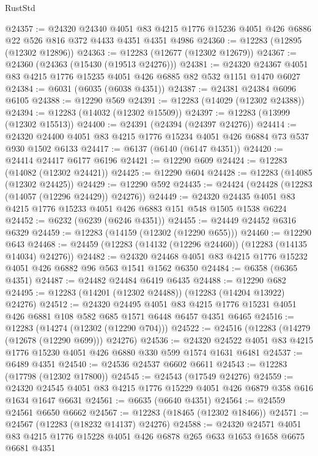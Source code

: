 \begin{lexlean}{RustStd}
\begin{coremodule}
@24357 := @24320
    @24340
    @4051
    @83
    @4215
    @1776
    @15236
    @4051
    @426
    @6886
    @22
    @526
    @816
    @372
    @4433
    @4351
    @4351
    @4986
@24360 := @12283 (@12895 (@12302 @12896))
@24363 := @12283 (@12677 (@12302 @12679))
@24367 := @24360 (@24363 (@15430 (@19513 @24276)))
@24381 := @24320 @24367 @4051 @83 @4215 @1776 @15235 @4051 @426 @6885 @82 @532 @1151 @1470 @6027
@24384 := @6031 (@6035 (@6038 @4351))
@24387 := @24381 @24384 @6096 @6105
@24388 := @12290 @569
@24391 := @12283 (@14029 (@12302 @24388))
@24394 := @12283 (@14032 (@12302 @15509))
@24397 := @12283 (@13999 (@12302 @15513))
@24400 := @24391 (@24394 (@24397 @24276))
@24414 := @24320 @24400 @4051 @83 @4215 @1776 @15234 @4051 @426 @6884 @73 @537 @930 @1502 @6133
@24417 := @6137 (@6140 (@6147 @4351))
@24420 := @24414 @24417 @6177 @6196
@24421 := @12290 @609
@24424 := @12283 (@14082 (@12302 @24421))
@24425 := @12290 @604
@24428 := @12283 (@14085 (@12302 @24425))
@24429 := @12290 @592
@24435 := @24424 (@24428 (@12283 (@14057 (@12296 @24429)) @24276))
@24449 := @24320 @24435 @4051 @83 @4215 @1776 @15233 @4051 @426 @6883 @151 @548 @1505 @1538 @6224
@24452 := @6232 (@6239 (@6246 @4351))
@24455 := @24449 @24452 @6316 @6329
@24459 := @12283 (@14159 (@12302 (@12290 @655)))
@24460 := @12290 @643
@24468 := @24459 (@12283 (@14132 (@12296 @24460)) (@12283 (@14135 @14034) @24276))
@24482 := @24320 @24468 @4051 @83 @4215 @1776 @15232 @4051 @426 @6882 @96 @563 @1541 @1562 @6350
@24484 := @6358 (@6365 @4351)
@24487 := @24482 @24484 @6419 @6435
@24488 := @12290 @682
@24495 := @12283 (@14201 (@12302 @24488)) (@12283 (@14204 @13922) @24276)
@24512 := @24320
    @24495
    @4051
    @83
    @4215
    @1776
    @15231
    @4051
    @426
    @6881
    @108
    @582
    @685
    @1571
    @6448
    @6457
    @4351
    @6465
@24516 := @12283 (@14274 (@12302 (@12290 @704)))
@24522 := @24516 (@12283 (@14279 (@12678 (@12290 @699))) @24276)
@24536 := @24320 @24522 @4051 @83 @4215 @1776 @15230 @4051 @426 @6880 @330 @599 @1574 @1631 @6481
@24537 := @6489 @4351
@24540 := @24536 @24537 @6602 @6611
@24543 := @12283 (@17798 (@12302 @17800))
@24545 := @24543 (@17549 @24276)
@24559 := @24320 @24545 @4051 @83 @4215 @1776 @15229 @4051 @426 @6879 @358 @616 @1634 @1647 @6631
@24561 := @6635 (@6640 @4351)
@24564 := @24559 @24561 @6650 @6662
@24567 := @12283 (@18465 (@12302 @18466))
@24571 := @24567 (@12283 (@18232 @14137) @24276)
@24588 := @24320
    @24571
    @4051
    @83
    @4215
    @1776
    @15228
    @4051
    @426
    @6878
    @265
    @633
    @1653
    @1658
    @6675
    @6681
    @4351

\end{coremodule}
\end{lexlean}
